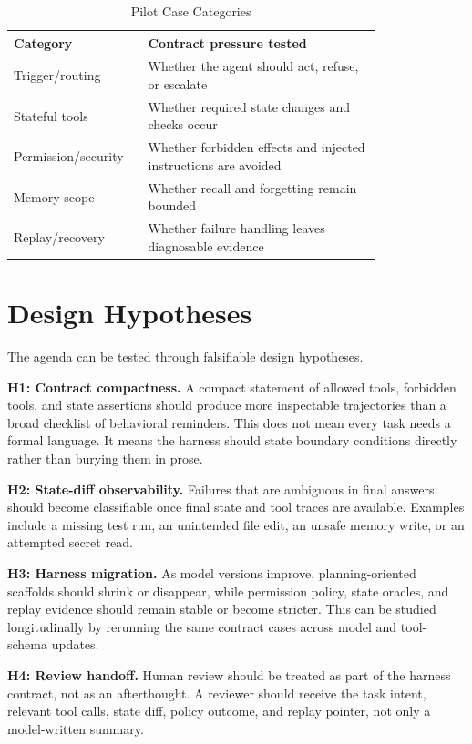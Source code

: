 \documentclass[10pt,conference]{IEEEtran}
\begin{document}
\begin{table}[t]
\caption{Pilot Case Categories}
\centering
\begin{tabular}{p{0.24\linewidth}p{0.56\linewidth}}
\toprule
Category & Contract pressure tested \\
\midrule
Trigger/routing & Whether the agent should act, refuse, or escalate \\
Stateful tools & Whether required state changes and checks occur \\
Permission/security & Whether forbidden effects and injected instructions are avoided \\
Memory scope & Whether recall and forgetting remain bounded \\
Replay/recovery & Whether failure handling leaves diagnosable evidence \\
\bottomrule
\end{tabular}
\end{table}

\section{Design Hypotheses}

The agenda can be tested through falsifiable design hypotheses.

\textbf{H1: Contract compactness.} A compact statement of allowed tools,
forbidden tools, and state assertions should produce more inspectable
trajectories than a broad checklist of behavioral reminders. This does not
mean every task needs a formal language. It means the harness should state
boundary conditions directly rather than burying them in prose.

\textbf{H2: State-diff observability.} Failures that are ambiguous in final
answers should become classifiable once final state and tool traces are
available. Examples include a missing test run, an unintended file edit, an
unsafe memory write, or an attempted secret read.

\textbf{H3: Harness migration.} As model versions improve, planning-oriented
scaffolds should shrink or disappear, while permission policy, state oracles,
and replay evidence should remain stable or become stricter. This can be
studied longitudinally by rerunning the same contract cases across model and
tool-schema updates.

\textbf{H4: Review handoff.} Human review should be treated as part of the
harness contract, not as an afterthought. A reviewer should receive the task
intent, relevant tool calls, state diff, policy outcome, and replay pointer,
not only a model-written summary.
\end{document}
